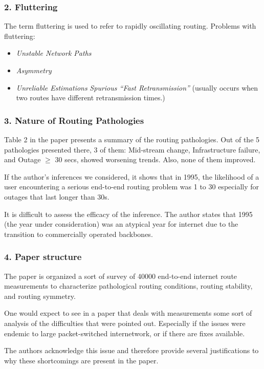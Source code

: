 \documentclass[10pt]{article}
\begin{document}
\subsubsection*{2. Fluttering}
The term fluttering is used to refer to rapidly oscillating routing. Problems with fluttering:
\begin{itemize}
 \item \textit{Unstable Network Paths} 
 \item \textit{Asymmetry}
 \item \textit{Unreliable Estimations}
 \textit{\textit{Spurious ``Fast Retransmission''}} (usually occurs when two routes have different retransmission times.)
\end{itemize}
\subsubsection*{3. Nature of Routing Pathologies}
Table 2 in the paper presents a summary of the routing pathologies. Out of the 5 pathologies presented there, 3 of them: Mid-stream change, Infrastructure failure, and Outage $\ge$ 30 secs, showed worsening trends. Also, none of them improved.

If the author's inferences we considered, it shows that in 1995, the likelihood of a user encountering a serious end-to-end routing problem was 1 to 30 especially for outages that last longer than 30s.

It is difficult to assess the efficacy of the inference. The author states that 1995 (the year under consideration) was an atypical year for internet due to the transition to commercially operated backbones.

\subsubsection*{4. Paper structure}

The paper is organized a sort of survey of 40000 end-to-end internet route measurements to characterize pathological routing conditions, routing stability, and routing symmetry. 

One would expect to see in a paper that deals with measurements some sort of analysis of the difficulties that were pointed out. Especially if the issues were endemic to large packet-switched internetwork, or if there are fixes available.

The authors acknowledge this issue and therefore provide several justifications to why these shortcomings are present in the paper.
\end{document}
